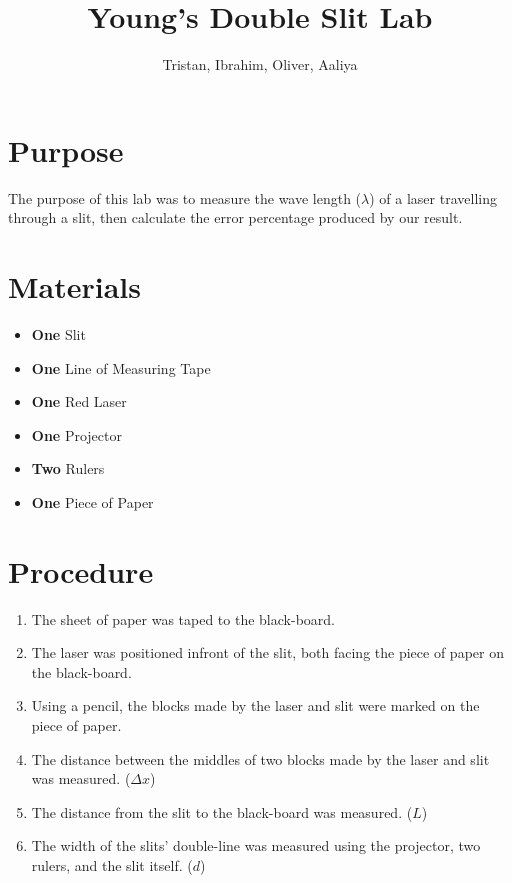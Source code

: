 \documentclass{article}
\title{Young's Double Slit Lab}
\author{Tristan, Ibrahim, Oliver, Aaliya}
\begin{document}
\maketitle
\section*{Purpose} {
    The purpose of this lab was to measure the wave length ($\lambda$) of a laser travelling through a slit, then calculate the error percentage produced by our result.
}
\section*{Materials} {
    \begin{itemize}
        \item {\textbf{One} Slit}
        \item {\textbf{One} Line of Measuring Tape}
        \item {\textbf{One} Red Laser}
        \item {\textbf{One} Projector}
        \item {\textbf{Two} Rulers}
        \item {\textbf{One} Piece of Paper}
    \end{itemize}\leavevmode
}
\section*{Procedure} {
    \begin{enumerate}
        \item {The sheet of paper was taped to the black-board.}
        \item {The laser was positioned infront of the slit, both facing the piece of paper on the black-board.}
        \item {Using a pencil, the blocks made by the laser and slit were marked on the piece of paper.}
        \item {The distance between the middles of two blocks made by the laser and slit was measured. ($\Delta x$)}
        \item {The distance from the slit to the black-board was measured. ($L$)}
        \item {The width of the slits' double-line was measured using the projector, two rulers, and the slit itself. ($d$)}
    \end{enumerate}\leavevmode
}
\end{document}
